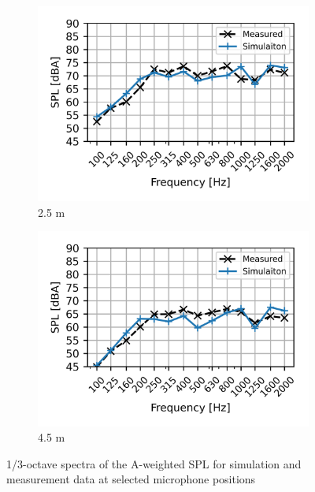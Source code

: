 \begin{figure}[H]
\begin{subfigure}[b]{0.49\textwidth}
		\includegraphics{fig/chap5/initial_model/freq_spectrum/pos_10cm_2pt5m.png}
		\caption{2.5 m}
	\end{subfigure}
	\begin{subfigure}[b]{0.49\textwidth}
		\centering
		\includegraphics{fig/chap5/initial_model/freq_spectrum/pos_10cm_4pt5m.png}
		\caption{4.5 m}
	\end{subfigure}
	\caption{1/3-octave spectra of the A-weighted SPL for simulation and measurement data at selected microphone positions}
	\label{fig:freq_spectrum}
\end{figure}


